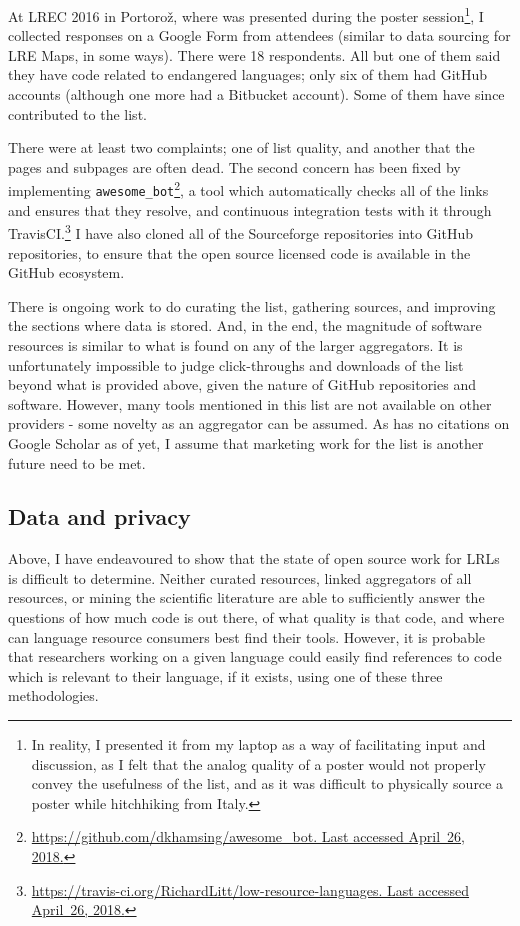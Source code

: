 At LREC 2016 in Portoro\v{z}, where \citet{CCURL} was presented during the poster session\footnote{In reality, I presented it from my laptop as a way of facilitating input and discussion, as I felt that the analog quality of a poster would not properly convey the usefulness of the list, and as it was difficult to physically source a poster while hitchhiking from Italy.}, I collected responses on a Google Form from attendees (similar to data sourcing for LRE Maps, in some ways). There were 18 respondents. All but one of them said they have code related to endangered languages; only six of them had GitHub accounts (although one more had a Bitbucket account). Some of them have since contributed to the list.

There were at least two complaints; one of list quality, and another that the pages and subpages are often dead. The second concern has been fixed by implementing {\tt awesome\_bot}\footnote{\href{https://github.com/dkhamsing/awesome\_bot}{https://github.com/dkhamsing/awesome\_bot. Last accessed April~26, 2018.}}, a tool which automatically checks all of the links and ensures that they resolve, and continuous integration tests with it through TravisCI.\footnote{\href{https://travis-ci.org/RichardLitt/low-resource-languages}{https://travis-ci.org/RichardLitt/low-resource-languages. Last accessed April~26, 2018.}} I have also cloned all of the Sourceforge repositories into GitHub repositories, to ensure that the open source licensed code is available in the GitHub ecosystem.

There is ongoing work to do curating the list, gathering sources, and improving the sections where data is stored. And, in the end, the magnitude of software resources is similar to what is found on any of the larger aggregators. It is unfortunately impossible to judge click-throughs and downloads of the list beyond what is provided above, given the nature of GitHub repositories and software. However, many tools mentioned in this list are not available on other providers - some novelty as an aggregator can be assumed. As \citet{CCURL} has no citations on Google Scholar as of yet, I assume that marketing work for the list is another future need to be met.

\subsection{Data and privacy}
\label{subsec:data-and-privacy}

Above, I have endeavoured to show that the state of open source work for LRLs is difficult to determine. Neither curated resources, linked aggregators of all resources, or mining the scientific literature are able to sufficiently answer the questions of how much code is out there, of what quality is that code, and where can language resource consumers best find their tools. However, it is probable that researchers working on a given language could easily find references to code which is relevant to their language, if it exists, using one of these three methodologies.

